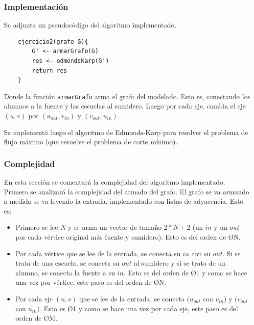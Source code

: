 

\subsubsection{Implementación}

Se adjunta un pseudocódigo del algoritmo implementado.

\begin{verbatim}
    ejercicio2(grafo G){
        G' <- armarGrafo(G)
        res <- edmondsKarp(G')
        return res
    }
\end{verbatim}

Donde la función \texttt{armarGrafo} arma el grafo del modelado. Esto es, conectando los alumnos a la fuente y las escuelas al sumidero. Luego por cada eje, cambia el eje $(u,v)$ por $(u_{out}, v_{in})$ y $(v_{out}, u_{in})$.

Se implementó luego el algoritmo de Edmonds-Karp para resolver el problema de flujo máximo (que resuelve el problema de corte mínimo).



\subsubsection{Complejidad}

En esta sección se comentará la complejidad del algoritmo implementado. Primero se analizará la complejidad del armado del grafo. El grafo se va armando a medida se va leyendo la entrada, implementado con listas de adyacencia. Esto es:

\begin{itemize}
\item Primero se lee $N$ y se arma un vector de tamaño $2*N + 2$ (un $in$ y un $out$ por cada vértice original más fuente y sumidero). Esto es del orden de \O{N}.
\item Por cada vértice que se lee de la entrada, se conecta su $in$ con su $out$. Si se trata de una escuela, se conecta su $out$ al sumidero y si se trata de un alumno, se conecta la fuente a su $in$. Esto es del orden de \O{1} y como se hace una vez por vértice, este paso es del orden de \O{N}.
\item Por cada eje $(u,v)$ que se lee de la entrada, se conecta $(u_{out}$ con $v_{in})$ y $(v_{out}$ con $u_{in})$. Esto es \O{1} y como se hace una vez por cada eje, este paso es del orden de \O{M}.
\end{itemize}

